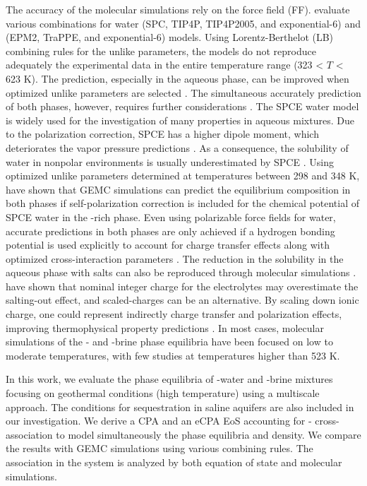 The accuracy of the molecular simulations rely on the force field (FF). \citeauthor{Liu2011} \cite{Liu2011} evaluate various combinations for  water (SPC, TIP4P, TIP4P2005, and exponential-6) and  (EPM2, TraPPE, and exponential-6) models. Using Lorentz-Berthelot (LB) combining rules for the unlike parameters, the models do not reproduce adequately the experimental data in the entire temperature range (323 < $T$ < 623 K). The prediction, especially in the aqueous phase, can be improved when optimized unlike parameters are selected \cite{Orozco2014, Vlcek2011}. The simultaneous accurately prediction of both phases, however, requires further considerations \cite{Orozco2014}. The SPCE water model is widely used for the investigation of many properties in aqueous mixtures. Due to the polarization correction, SPCE has a higher dipole moment, which deteriorates the vapor pressure predictions \cite{Vorholz2004}. As a consequence, the solubility of water in nonpolar environments is usually underestimated by SPCE \cite{Vlcek2011}. Using optimized unlike parameters determined at temperatures between 298 and 348 K, \citeauthor{Vlcek2011} \cite{Vlcek2011} have shown that GEMC simulations can predict the equilibrium composition in both phases if self-polarization correction is included for the chemical potential of SPCE water in the -rich phase. Even using polarizable force fields for water, accurate predictions in both phases are only achieved if a hydrogen bonding potential is used explicitly to account for charge transfer effects along with optimized cross-interaction parameters \cite{Jiang2017a}. The reduction in the  solubility in the aqueous phase with salts can also be reproduced through molecular simulations \cite{Blazquez2024, Vorholz2004, Liu2013}. \citeauthor{Blazquez2024} \cite{Blazquez2024} have shown that nominal integer charge for the electrolytes may overestimate the salting-out effect, and scaled-charges can be an alternative. By scaling down ionic charge, one could represent indirectly charge transfer and polarization effects, improving thermophysical property predictions \cite{Zeron2019, Coelho2024}. In most cases, molecular simulations of the - and -brine phase equilibria have been focused on low to moderate temperatures, with few studies \cite{Liu2011} at temperatures higher than 523 K. 

In this work, we evaluate the phase equilibria of -water and -brine mixtures focusing on geothermal conditions (high temperature) using a multiscale approach. The conditions for  sequestration in saline aquifers are also included in our investigation. We derive a CPA and an eCPA EoS accounting for - cross-association to model simultaneously the phase equilibria and density. We compare the results with GEMC simulations using various combining rules. The association in the system is analyzed by both equation of state and molecular simulations.
